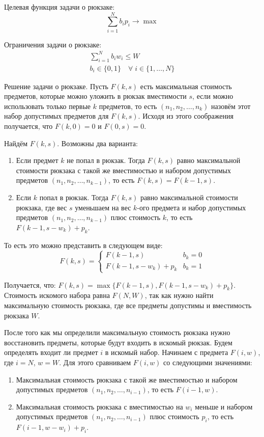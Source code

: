 Целевая функция задачи о рюкзаке:
\begin{equation}
    \sum_{i=1}^Nb_ip_i \longrightarrow \max
\end{equation}

Ограничения задачи о рюкзаке:
\begin{equation}
\begin{multlined}
    \sum_{i=1}^Nb_iw_i \leq W\\
    b_i \in \{0,1\} \quad \forall \; i \in \{1, \hdots, N\}
\end{multlined}
\end{equation}

Решение задачи о рюкзаке. Пусть $F(k,s)$ есть максимальная стоимость предметов, которые можно уложить в рюкзак вместимости $s$, если можно использовать только первые $k$ предметов, то есть $(n_1,n_2, \hdots, n_k)$ назовём этот набор допустимых предметов для $F(k,s)$. Исходя из этого соображения получается, что $F(k,0)=0$ и $F(0,s)=0$.

Найдём $F(k,s)$. Возможны два варианта:
\begin{enumerate}[wide]
    \item Если предмет $k$ не попал в рюкзак. Тогда $F(k,s)$ равно максимальной стоимости рюкзака с такой же вместимостью и набором допустимых предметов $(n_1,n_2, \hdots, n_{k-1})$, то есть $F(k,s)=F(k-1,s)$.
    \item Если $k$ попал в рюкзак. Тогда $F(k,s)$ равно максимальной стоимости рюкзака, где вес $s$ уменьшаем на вес $k$-ого предмета и набор допустимых предметов $(n_1,n_2, \hdots, n_{k-1})$ плюс стоимость $k$, то есть $F(k-1,s-w_k)+p_k$.
\end{enumerate}

То есть это можно представить в следующем виде:
\begin{equation}
    F(k,s) = \begin{cases}
                    F(k-1,s) & b_k=0\\
                    F(k-1,s-w_k)+p_k & b_k=1
                \end{cases}
\end{equation}


Получается, что: $F(k,s)=\max\{F(k-1, s),F(k-1,s-w_k)+p_k\}$. Стоимость искомого набора равна $F(N,W)$, так как нужно найти максимальную стоимость рюкзака, где все предметы допустимы и вместимость рюкзака $W$.

После того как мы определили максимальную стоимость рюкзака нужно восстановить предметы, которые будут входить в искомый рюкзак. Будем определять входит ли предмет $i$ в искомый набор. Начинаем с предмета $F(i,w)$, где $i=N$, $w=W$. Для этого сравниваем $F(i,w)$ со следующими значениями:
\begin{enumerate}[wide]
    \item Максимальная стоимость рюкзака с такой же вместимостью и набором допустимых предметов $(n_1, n_2, \hdots, n_{i-1})$, то есть $F(i-1,w)$.
    \item Максимальная стоимость рюкзака с вместимостью на $w_i$ меньше и набором допустимых предметов $(n_1, n_2, \hdots, n_{i-1})$ плюс стоимость $p_i$, то есть \mbox{$F(i-1,w-w_i)+p_i$}.
\end{enumerate}

